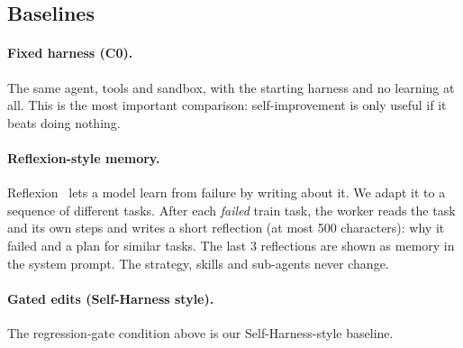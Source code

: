 \subsection{Baselines}
\label{sec:baselines}

\paragraph{Fixed harness (C0).}
The same agent, tools and sandbox, with the starting harness and no learning at all. This is the
most important comparison: self-improvement is only useful if it beats doing nothing.

\paragraph{Reflexion-style memory.}
Reflexion~\cite{shinn2023reflexion} lets a model learn from failure by writing about it. We adapt
it to a sequence of different tasks. After each \emph{failed} train task, the worker reads the task
and its own steps and writes a short reflection (at most 500 characters): why it failed and a plan
for similar tasks. The last 3 reflections are shown as memory in the system prompt. The strategy,
skills and sub-agents never change.

\paragraph{Gated edits (Self-Harness style).}
The regression-gate condition above is our Self-Harness-style baseline.
